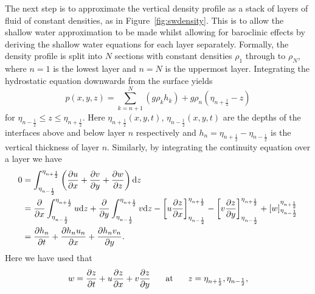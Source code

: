\documentclass[12pt,a4paper]{report}
\newcommand*\figref[1]{Figure~\ref{#1}}
\newcommand*{\half}{\frac{1}{2}}
\begin{document}
    The next step is to approximate the vertical density profile as a stack of
    layers of fluid of constant densities, as in \figref{fig:swdensity}. 
    This is to allow the shallow
    water approximation to be made whilst allowing for baroclinic effects by 
    deriving the shallow water equations for each layer separately. Formally, 
    the density profile is split into $N$ sections with constant densities 
    $\rho_{1}$ through to $\rho_{N}$, where $n=1$ is the lowest layer and $n=N$
    is the uppermost layer. Integrating the hydrostatic equation
    downwards from the surface yields 
    \begin{equation}
    p(x,y,z)=\sum^{N}_{k=n+1}\left(g \rho_{k} h_{k} \right) + g \rho_{n}\left(\eta_{n+\half } - z \right)
    \end{equation}
    for $\eta_{n-\half }\leq z \leq \eta_{n+\half }$. Here $\eta_{n+\half }(x,y,t)$,
    $\eta_{n-\half }(x,y,t)$ are the depths of the interfaces above and below layer $n$
    respectively and $h_{n} = \eta_{n+\half } -\eta_{n-\half }$ is the vertical
     thickness  of layer $n$. Similarly, by integrating the continuity equation over a layer
     we have
     \begin{equation}
     \begin{split}
     0 &=\int^{\eta_{n+\half }}_{\eta_{n-\half }}\left(\frac{\partial u}{\partial x} + \frac{\partial v}{\partial y} +\frac{\partial w}{\partial z} \right){\rm d} z \\
     &=\frac{\partial }{\partial x}\int^{\eta_{n+\half }}_{\eta_{n-\half }} u{\rm d} z +
     \frac{\partial }{\partial y}\int^{\eta_{n+\half }}_{\eta_{n-\half }} v{\rm d} z
      -  \left[ u   \frac{\partial z}{\partial x} \right]^{\eta_{n+\half }}_{\eta_{n-\half }} 
      -  \left[ v  \frac{\partial z}{\partial y}\right]^{\eta_{n+\half }}_{\eta_{n-\half }}  +
      \left[ w \right]^{\eta_{n+\half }}_{\eta_{n-\half }} \\
     &=\frac{\partial h_{n} }{\partial t} +\frac{\partial h_{n} u_{n}}{\partial x}+
     \frac{\partial h_{n} v_{n} }{\partial y}.      \\
     \end{split}
     \end{equation}
   Here we have used that 
   \begin{equation*}
   w =  \frac{\partial z }{\partial t} + u \frac{\partial z}{\partial x} 
         + v \frac{\partial z}{\partial y} \mbox{\hspace{5mm} at \hspace{5mm}} z = \eta_{n+\half } , \eta_{n-\half },
   \end{equation*}
\end{document}
